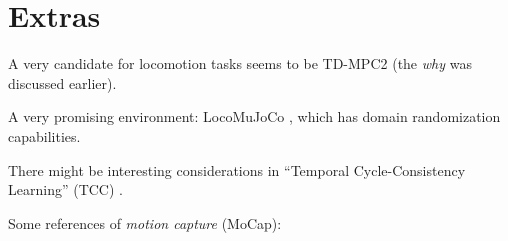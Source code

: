 \documentclass[12pt,a4paper]{article}
\begin{document}
\section{Extras}
\label{s:best}

A very candidate for locomotion tasks seems to be TD-MPC2 \cite{Hansen2024-ld}
(the \emph{why} was discussed earlier).

A very promising environment: LocoMuJoCo \cite{Al-Hafez2023-dn},
which has domain randomization capabilities.

There might be interesting considerations in
``Temporal Cycle-Consistency Learning'' (TCC) \cite{Dwibedi2019-jv}.

Some references of \emph{motion capture} (MoCap):
\cite{Merel2017-lo, Merel2019-rn, Merel2020-ea, La_Barbera2021-kq, Bohez2022-jt,
Liu2022-lw, Winkler2022-nr, Sun2023-bl, Radosavovic2024-xl}


\end{document}
